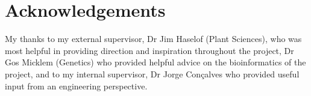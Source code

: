 
\chapter*{Acknowledgements}

My thanks to my external supervisor, Dr Jim Haselof (Plant Sciences),
who was most helpful in providing direction and inspiration throughout the
project, Dr Gos Micklem (Genetics) who provided helpful advice on the
bioinformatics of the project, and to my internal supervisor, 
Dr Jorge Con\c{c}alves who provided useful input from an engineering
perspective.

